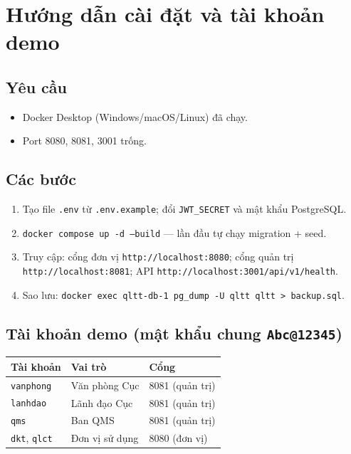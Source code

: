 \chapter{Hướng dẫn cài đặt và tài khoản demo}

\section{Yêu cầu}
\begin{itemize}
  \item Docker Desktop (Windows/macOS/Linux) đã chạy.
  \item Port 8080, 8081, 3001 trống.
\end{itemize}

\section{Các bước}
\begin{enumerate}
  \item Tạo file \texttt{.env} từ \texttt{.env.example}; đổi \texttt{JWT\_SECRET} và mật khẩu PostgreSQL.
  \item \texttt{docker compose up -d --build} — lần đầu tự chạy migration + seed.
  \item Truy cập: cổng đơn vị \texttt{http://localhost:8080}; cổng quản trị \texttt{http://localhost:8081}; API \texttt{http://localhost:3001/api/v1/health}.
  \item Sao lưu: \texttt{docker exec qltt-db-1 pg\_dump -U qltt qltt > backup.sql}.
\end{enumerate}

\section{Tài khoản demo (mật khẩu chung \texttt{Abc@12345})}

\begin{table}[h]
\centering
\begin{tabular}{lll}
\toprule
\textbf{Tài khoản} & \textbf{Vai trò} & \textbf{Cổng} \\
\midrule
\texttt{vanphong} & Văn phòng Cục & 8081 (quản trị) \\
\texttt{lanhdao} & Lãnh đạo Cục & 8081 (quản trị) \\
\texttt{qms} & Ban QMS & 8081 (quản trị) \\
\texttt{dkt}, \texttt{qlct} & Đơn vị sử dụng & 8080 (đơn vị) \\
\bottomrule
\end{tabular}
\end{table}

